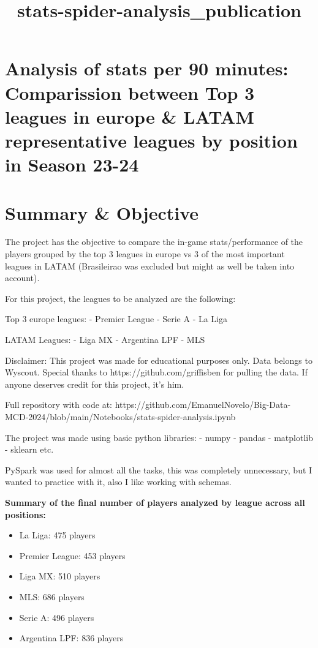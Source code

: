 \documentclass[11pt]{article}
\title{stats-spider-analysis\_publication}
\providecommand{\tightlist}{%
      \setlength{\itemsep}{0pt}\setlength{\parskip}{0pt}}
\begin{document}
    
    \maketitle
    
    

    
    \section{Analysis of stats per 90 minutes: Comparission between Top 3
leagues in europe \& LATAM representative leagues by position in Season
23-24}\label{analysis-of-stats-per-90-minutes-comparission-between-top-3-leagues-in-europe-latam-representative-leagues-by-position-in-season-23-24}

    \section{Summary \& Objective}\label{summary-objective}

    The project has the objective to compare the in-game stats/performance
of the players grouped by the top 3 leagues in europe vs 3 of the most
important leagues in LATAM (Brasileirao was excluded but might as well
be taken into account).

For this project, the leagues to be analyzed are the following:

Top 3 europe leagues: - Premier League - Serie A - La Liga

LATAM Leagues: - Liga MX - Argentina LPF - MLS

Disclaimer: This project was made for educational purposes only. Data
belongs to Wyscout. Special thanks to https://github.com/griffisben for
pulling the data. If anyone deserves credit for this project, it's him.

Full repository with code at:
https://github.com/EmanuelNovelo/Big-Data-MCD-2024/blob/main/Notebooks/stats-spider-analysis.ipynb

    The project was made using basic python libraries: - numpy - pandas -
matplotlib - sklearn etc.

PySpark was used for almost all the tasks, this was completely
unnecessary, but I wanted to practice with it, also I like working with
schemas.

    \textbf{Summary of the final number of players analyzed by league across
all positions:}

\begin{itemize}
\tightlist
\item
  La Liga: 475 players
\item
  Premier League: 453 players
\item
  Liga MX: 510 players
\item
  MLS: 686 players
\item
  Serie A: 496 players
\item
  Argentina LPF: 836 players
\end{itemize}
\end{document}
